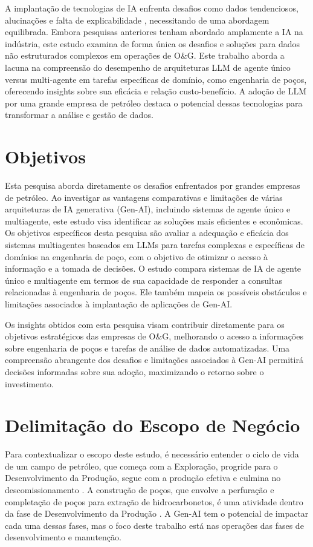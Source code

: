 A implantação de tecnologias de IA enfrenta desafios como dados tendenciosos, alucinações e falta de explicabilidade \cite{Hadi2023}, necessitando de uma abordagem equilibrada. Embora pesquisas anteriores tenham abordado amplamente a IA na indústria, este estudo examina de forma única os desafios e soluções para dados não estruturados complexos em operações de O\&G. Este trabalho aborda a lacuna na compreensão do desempenho de arquiteturas LLM de agente único versus multi-agente em tarefas específicas de domínio, como engenharia de poços, oferecendo insights sobre sua eficácia e relação custo-benefício. A adoção de LLM por uma grande empresa de petróleo destaca o potencial dessas tecnologias para transformar a análise e gestão de dados.

\section{Objetivos}

Esta pesquisa aborda diretamente os desafios enfrentados por grandes empresas de petróleo. Ao investigar as vantagens comparativas e limitações de várias arquiteturas de IA generativa (Gen-AI), incluindo sistemas de agente único e multiagente, este estudo visa identificar as soluções mais eficientes e econômicas.
Os objetivos específicos desta pesquisa são avaliar a adequação e eficácia dos sistemas multiagentes baseados em LLMs para tarefas complexas e específicas de domínios na engenharia de poço, com o objetivo de otimizar o acesso à informação e a tomada de decisões.
O estudo compara sistemas de IA de agente único e multiagente em termos de sua capacidade de responder a consultas relacionadas à engenharia de poços. Ele também mapeia os possíveis obstáculos e limitações associados à implantação de aplicações de Gen-AI.

Os insights obtidos com esta pesquisa visam contribuir diretamente para os objetivos estratégicos das empresas de O\&G, melhorando o acesso a informações sobre engenharia de poços e tarefas de análise de dados automatizadas.
Uma compreensão abrangente dos desafios e limitações associados à Gen-AI permitirá decisões informadas sobre sua adoção, maximizando o retorno sobre o investimento.

\section{Delimitação do Escopo de Negócio}

Para contextualizar o escopo deste estudo, é necessário entender o ciclo de vida de um campo de petróleo, que começa com a Exploração, progride para o Desenvolvimento da Produção, segue com a produção efetiva e culmina no descomissionamento \cite{Badiru2016}. A construção de poços, que envolve a perfuração e completação de poços para extração de hidrocarbonetos, é uma atividade dentro da fase de Desenvolvimento da Produção \cite{Thomas2004}. A Gen-AI tem o potencial de impactar cada uma dessas fases, mas o foco deste trabalho está nas operações das fases de desenvolvimento e manutenção.

